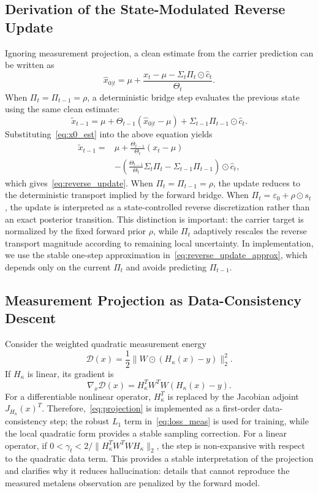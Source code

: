 \documentclass[journal]{IEEEtran}
\newcommand{\hk}{H_{\kappa}}
\newcommand{\eps}{\varepsilon}
\begin{document}
\subsection{Derivation of the State-Modulated Reverse Update}
Ignoring measurement projection, a clean estimate from the carrier prediction can be written as
\begin{equation}
    \hat{x}_{0|t}=\mu+\frac{x_t-\mu-\Sigma_t\Pi_t\odot\hat c_t}{\Theta_t}.
    \label{eq:x0_est}
\end{equation}
When $\Pi_t=\Pi_{t-1}=\rho$, a deterministic bridge step evaluates the previous state using the same clean estimate:
\begin{equation}
    \tilde{x}_{t-1}=\mu+\Theta_{t-1}(\hat{x}_{0|t}-\mu)+\Sigma_{t-1}\Pi_{t-1}\odot\hat c_t.
\end{equation}
Substituting~\eqref{eq:x0_est} into the above equation yields
\begin{equation}
\begin{split}
    \tilde{x}_{t-1}={}&\mu+\frac{\Theta_{t-1}}{\Theta_t}(x_t-\mu) \\
    &-\left(\frac{\Theta_{t-1}}{\Theta_t}\Sigma_t\Pi_t-\Sigma_{t-1}\Pi_{t-1}\right)\odot\hat c_t,
\end{split}
\end{equation}
which gives~\eqref{eq:reverse_update}. When $\Pi_t=\Pi_{t-1}=\rho$, the update reduces to the deterministic transport implied by the forward bridge. When $\Pi_t=\eps_0+\rho\odot s_t$, the update is interpreted as a state-controlled reverse discretization rather than an exact posterior transition. This distinction is important: the carrier target is normalized by the fixed forward prior $\rho$, while $\Pi_t$ adaptively rescales the reverse transport magnitude according to remaining local uncertainty. In implementation, we use the stable one-step approximation in~\eqref{eq:reverse_update_approx}, which depends only on the current $\Pi_t$ and avoids predicting $\Pi_{t-1}$.

\subsection{Measurement Projection as Data-Consistency Descent}
Consider the weighted quadratic measurement energy
\begin{equation}
    \mathcal{D}(x)=\frac{1}{2}\|W\odot(\hk(x)-y)\|_2^2.
\end{equation}
If $\hk$ is linear, its gradient is
\begin{equation}
    \nabla_x\mathcal{D}(x)=\hk^T W^T W(\hk(x)-y).
\end{equation}
For a differentiable nonlinear operator, $\hk^T$ is replaced by the Jacobian adjoint $J_{\hk}(x)^T$. Therefore,~\eqref{eq:projection} is implemented as a first-order data-consistency step; the robust $L_1$ term in~\eqref{eq:loss_meas} is used for training, while the local quadratic form provides a stable sampling correction. For a linear operator, if $0<\gamma_t<2/\|\hk^T W^T W\hk\|_2$, the step is non-expansive with respect to the quadratic data term. This provides a stable interpretation of the projection and clarifies why it reduces hallucination: details that cannot reproduce the measured metalens observation are penalized by the forward model.
\end{document}
